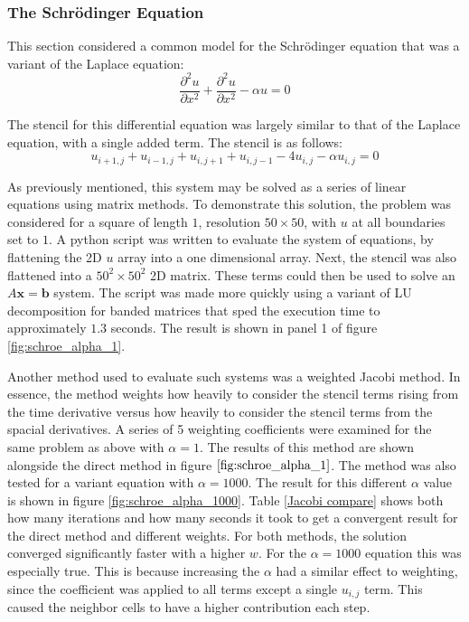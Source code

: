 \documentclass[twocolumn]{article}
\begin{document}
\subsubsection{The Schr\"{o}dinger Equation}
This section considered a common model for the Schr\"{o}dinger equation that was a variant of the Laplace equation:
\begin{equation}
\frac{\partial^2 u}{\partial x^2} + \frac{\partial^2 u}{\partial x^2} - \alpha u = 0
\end{equation}

The stencil for this differential equation was largely similar to that of the Laplace equation, with a single added term. The stencil is as follows:
\begin{equation}
	u_{i+1,j} + u_{i-1,j} + u_{i,j+1} + u_{i,j-1} - 4u_{i,j} -\alpha u_{i,j}=0
\end{equation}

As previously mentioned, this system may be solved as a series of linear equations using matrix methods. To demonstrate this solution, the problem was considered for a square of length $1$, resolution $50\times50$, with $u$ at all boundaries set to $1$. A python script was written to evaluate the system of equations, by flattening the 2D $u$ array into a one dimensional array. Next, the stencil was also flattened into a $50^2 \times 50^2$ 2D matrix. These terms could then be used to solve an $A\mathbf{x} = \mathbf{b}$ system. The script was made more quickly using a variant of LU decomposition for banded matrices that sped the execution time to approximately $1.3$ seconds. The result is shown in panel 1 of figure \ref{fig:schroe_alpha_1}.

Another method used to evaluate such systems was a weighted Jacobi method. In essence, the method weights how heavily to consider the stencil terms rising from the time derivative versus how heavily to consider the stencil terms from the spacial derivatives. A series of 5 weighting coefficients were examined for the same problem as above with $\alpha = 1$. The results of this method are shown alongside the direct method in figure $\ref{fig:schroe_alpha_1}$. The method was also tested for a variant equation with $\alpha=1000$. The result for this different $\alpha$ value is shown in figure \ref{fig:schroe_alpha_1000}. Table \ref{Jacobi compare} shows both how many iterations and how many seconds it took to get a convergent result for the direct method and different weights. For both methods, the solution converged significantly faster with a higher $w$. For the $\alpha = 1000$ equation this was especially true. This is because increasing the $\alpha$ had a similar effect to weighting, since the coefficient was applied to all terms except a single $u_{i,j}$ term. This caused the neighbor cells to have a higher contribution each step.
\end{document}
